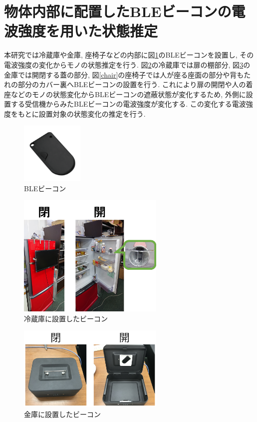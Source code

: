 \documentclass[Japanese]{dicomopapers}
\begin{document}





\section{物体内部に配置したBLEビーコンの電波強度を用いた状態推定}
本研究では冷蔵庫や金庫, 座椅子などの内部に図\ref{beacon}のBLEビーコンを設置し, その電波強度の変化からモノの状態推定を行う.
図\ref{freezer}の冷蔵庫では扉の棚部分, 図\ref{safe}の金庫では開閉する蓋の部分, 図\ref{chair}の座椅子では人が座る座面の部分や背もたれの部分のカバー裏へBLEビーコンの設置を行う.
これにより扉の開閉や人の着座などのモノの状態変化からBLEビーコンの遮蔽状態が変化するため, 外側に設置する受信機からみたBLEビーコンの電波強度が変化する.
この変化する電波強度をもとに設置対象の状態変化の推定を行う.
\begin{figure}[ht]
    \centering
    \includegraphics[width=3cm]{ble.png}
    \caption{BLEビーコン}
    \label{beacon}
   \end{figure}
\begin{figure}[ht]
    \centering
    \includegraphics[width=7cm]{regisW2.png}
    \caption{冷蔵庫に設置したビーコン}
    \label{freezer}
\end{figure}
\begin{figure}[ht]
    \centering
    \includegraphics[width=7cm]{kinkoW.png}
    \caption{金庫に設置したビーコン}
    \label{safe}
\end{figure}
\end{document}
